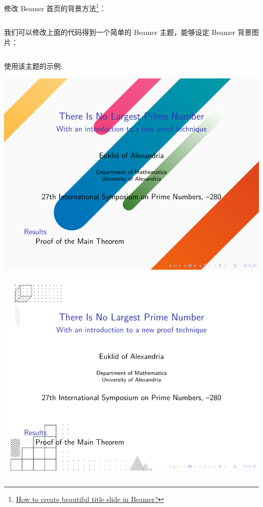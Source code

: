 \begin{column}{0.5\textwidth}
修改 Beamer 首页的背景方法\footnote{\href{https://latex-beamer.com/tutorials/beautiful-title/}{How to create beautiful title slide in Beamer?}}：

\inputminted[linenos=true]{latex}{examples/beamer/themes/background/beautiful-title.tex}

我们可以修改上面的代码得到一个简单的 Beamer 主题，能够设定 Beamer 背景图片：

\inputminted[linenos=true]{latex}{examples/beamer/themes/background/beamerthemenovel.sty}

使用该主题的示例:

\includegraphics[page=1]{examples/beamer/themes/background/sample01.pdf}

\includegraphics[page=1]{examples/beamer/themes/background/sample02.pdf}


\end{column}
